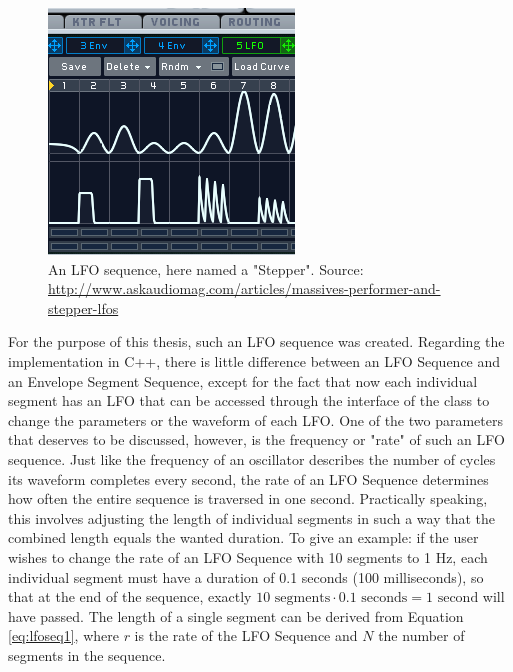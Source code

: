 \documentclass[12pt,twoside]{report}
\begin{document}

\begin{figure}
  \includegraphics[scale=0.6]{img/lfoseq}
  \caption{An LFO sequence, here named a "Stepper". Source: \protect\url{http://www.askaudiomag.com/articles/massives-performer-and-stepper-lfos}}
  \label{fig:lfoseq}
\end{figure}

\noindent For the purpose of this thesis, such an LFO sequence was created. Regarding the implementation in C++, there is little difference between an LFO Sequence and an Envelope Segment Sequence, except for the fact that now each individual segment has an LFO that can be accessed through the interface of the class to change the parameters or the waveform of each LFO. One of the two parameters that deserves to be discussed, however, is the frequency or "rate" of such an LFO sequence. Just like the frequency of an oscillator describes the number of cycles its waveform completes every second, the rate of an LFO Sequence determines how often the entire sequence is traversed in one second. Practically speaking, this involves adjusting the length of individual segments in such a way that the combined length equals the wanted duration. To give an example: if the user wishes to change the rate of an LFO Sequence with 10 segments to 1 Hz, each individual segment must have a duration of 0.1 seconds (100 milliseconds), so that at the end of the sequence, exactly $10 \text{ segments} \cdot 0.1 \text{ seconds} = 1 \text{ second}$ will have passed. The length of a single segment can be derived from Equation \ref{eq:lfoseq1}, where $r$ is the rate of the LFO Sequence and $N$ the number of segments in the sequence.
\end{document}
